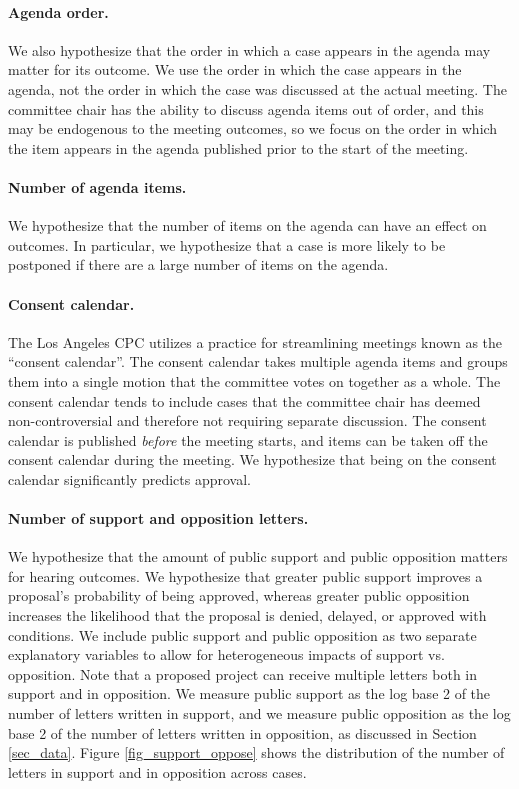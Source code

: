 \paragraph{Agenda order.} We also hypothesize that the order in which a case appears in the agenda may matter for its outcome. We use the order in which the case appears in the agenda, not the order in which the case was discussed at the actual meeting. The committee chair has the ability to discuss agenda items out of order, and this may be endogenous to the meeting outcomes, so we focus on the order in which the item appears in the agenda published prior to the start of the meeting.

\paragraph{Number of agenda items.} We hypothesize that the number of items on the agenda can have an effect on outcomes. In particular, we hypothesize that a case is more likely to be postponed if there are a large number of items on the agenda.

\paragraph{Consent calendar.} The Los Angeles CPC utilizes a practice for streamlining meetings known as the ``consent calendar''. The consent calendar takes multiple agenda items and groups them into a single motion that the committee votes on together as a whole. The consent calendar tends to include cases that the committee chair has deemed non-controversial and therefore not requiring separate discussion. The consent calendar is published \emph{before} the meeting starts, and items can be taken off the consent calendar during the meeting. We hypothesize that being on the consent calendar significantly predicts approval.

\paragraph{Number of support and opposition letters.} We hypothesize that the amount of public support and public opposition matters for hearing outcomes. We hypothesize that greater public support improves a proposal's probability of being approved, whereas greater public opposition increases the likelihood that the proposal is denied, delayed, or approved with conditions. We include public support and public opposition as two separate explanatory variables to allow for heterogeneous impacts of support vs. opposition. Note that a proposed project can receive multiple letters both in support and in opposition. We measure public support as the log base 2 of the number of letters written in support, and we measure public opposition as the log base 2 of the number of letters written in opposition, as discussed in Section \ref{sec_data}. Figure \ref{fig_support_oppose} shows the distribution of the number of letters in support and in opposition across cases. 

